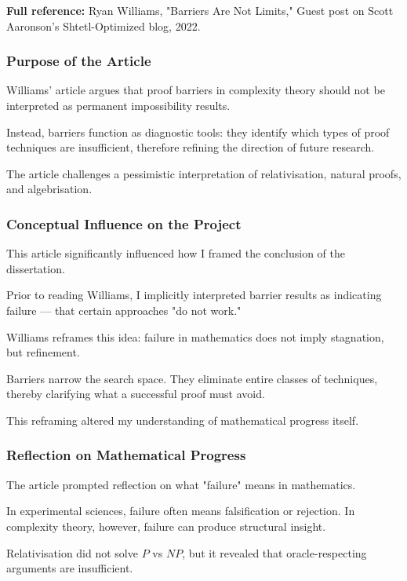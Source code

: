 \documentclass[12pt]{article}
\begin{document}
\textbf{Full reference:} Ryan Williams,
"Barriers Are Not Limits,"
Guest post on Scott Aaronson's Shtetl-Optimized blog, 2022.

\subsubsection*{Purpose of the Article}

Williams' article argues that proof barriers in complexity theory should not be interpreted as permanent impossibility results.

Instead, barriers function as diagnostic tools: they identify which types of proof techniques are insufficient, therefore refining the direction of future research.

The article challenges a pessimistic interpretation of relativisation, natural proofs, and algebrisation.

\subsubsection*{Conceptual Influence on the Project}

This article significantly influenced how I framed the conclusion of the dissertation.

Prior to reading Williams, I implicitly interpreted barrier results as indicating failure --- that certain approaches "do not work."

Williams reframes this idea: failure in mathematics does not imply stagnation, but refinement.

Barriers narrow the search space. They eliminate entire classes of techniques, thereby clarifying what a successful proof must avoid.

This reframing altered my understanding of mathematical progress itself.

\subsubsection*{Reflection on Mathematical Progress}

The article prompted reflection on what "failure" means in mathematics.

In experimental sciences, failure often means falsification or rejection. In complexity theory, however, failure can produce structural insight.

Relativisation did not solve $P$ vs $NP$, but it revealed that oracle-respecting arguments are insufficient.
\end{document}
